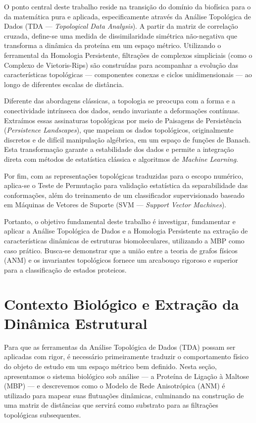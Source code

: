 \documentclass[12pt, a4paper]{article}
\theoremstyle{plain}
\theoremstyle{definition}
\theoremstyle{remark}
\newcommand{\ident}{\hspace{2em}}
\begin{document}
\ident O ponto central deste trabalho reside na transição do domínio da biofísica para o da matemática pura e aplicada, especificamente através da Análise Topológica de Dados (TDA — \textit{Topological Data Analysis}). A partir da matriz de correlação cruzada, define-se uma medida de dissimilaridade simétrica não-negativa que transforma a dinâmica da proteína em um espaço métrico. Utilizando o ferramental da Homologia Persistente, filtrações de complexos simpliciais (como o Complexo de Vietoris-Rips) são construídas para acompanhar a evolução das características topológicas — componentes conexas e ciclos unidimensionais — ao longo de diferentes escalas de distância. 

\ident Diferente das abordagens clássicas, a topologia se preocupa com a forma e a conectividade intrínseca dos dados, sendo invariante a deformações contínuas. Extraímos essas assinaturas topológicas por meio de Paisagens de Persistência (\textit{Persistence Landscapes}), que mapeiam os dados topológicos, originalmente discretos e de difícil manipulação algébrica, em um espaço de funções de Banach. Esta transformação garante a estabilidade dos dados e permite a integração direta com métodos de estatística clássica e algoritmos de \textit{Machine Learning}.

\ident Por fim, com as representações topológicas traduzidas para o escopo numérico, aplica-se o Teste de Permutação para validação estatística da separabilidade das conformações, além do treinamento de um classificador supervisionado baseado em Máquinas de Vetores de Suporte (SVM — \textit{Support Vector Machines}). 

\ident Portanto, o objetivo fundamental deste trabalho é investigar, fundamentar e aplicar a Análise Topológica de Dados e a Homologia Persistente na extração de características dinâmicas de estruturas biomoleculares, utilizando a MBP como caso prático. Busca-se demonstrar que a união entre a teoria de grafos físicos (ANM) e os invariantes topológicos fornece um arcabouço rigoroso e superior para a classificação de estados proteicos.

\section{Contexto Biológico e Extração da Dinâmica Estrutural}

\ident Para que as ferramentas da Análise Topológica de Dados (TDA) possam ser aplicadas com rigor, é necessário primeiramente traduzir o comportamento físico do objeto de estudo em um espaço métrico bem definido. Nesta seção, apresentamos o sistema biológico sob análise — a Proteína de Ligação à Maltose (MBP) — e descrevemos como o Modelo de Rede Anisotrópica (ANM) é utilizado para mapear suas flutuações dinâmicas, culminando na construção de uma matriz de distâncias que servirá como substrato para as filtrações topológicas subsequentes.
\end{document}
